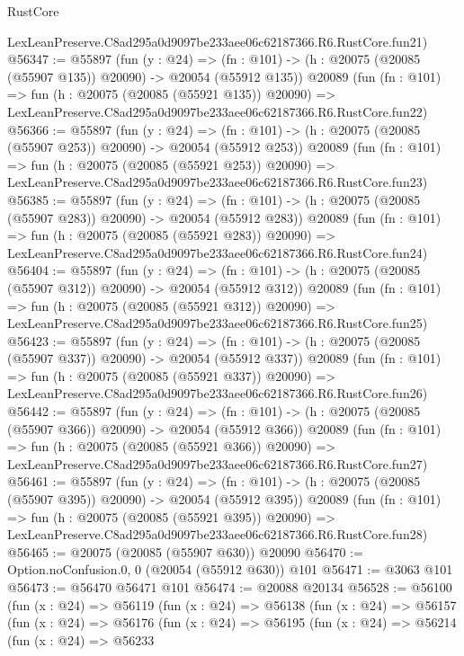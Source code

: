 \begin{lexlean}{RustCore}
\begin{coremodule}
    LexLeanPreserve.C8ad295a0d9097be233aee06c62187366.R6.RustCore.fun21)
@56347 := @55897
    (fun (y : @24) =>
    (fn : @101) -> (h : @20075 (@20085 (@55907 @135)) @20090) -> @20054 (@55912 @135))
    @20089
    (fun (fn : @101) =>
    fun (h : @20075 (@20085 (@55921 @135)) @20090) =>
    LexLeanPreserve.C8ad295a0d9097be233aee06c62187366.R6.RustCore.fun22)
@56366 := @55897
    (fun (y : @24) =>
    (fn : @101) -> (h : @20075 (@20085 (@55907 @253)) @20090) -> @20054 (@55912 @253))
    @20089
    (fun (fn : @101) =>
    fun (h : @20075 (@20085 (@55921 @253)) @20090) =>
    LexLeanPreserve.C8ad295a0d9097be233aee06c62187366.R6.RustCore.fun23)
@56385 := @55897
    (fun (y : @24) =>
    (fn : @101) -> (h : @20075 (@20085 (@55907 @283)) @20090) -> @20054 (@55912 @283))
    @20089
    (fun (fn : @101) =>
    fun (h : @20075 (@20085 (@55921 @283)) @20090) =>
    LexLeanPreserve.C8ad295a0d9097be233aee06c62187366.R6.RustCore.fun24)
@56404 := @55897
    (fun (y : @24) =>
    (fn : @101) -> (h : @20075 (@20085 (@55907 @312)) @20090) -> @20054 (@55912 @312))
    @20089
    (fun (fn : @101) =>
    fun (h : @20075 (@20085 (@55921 @312)) @20090) =>
    LexLeanPreserve.C8ad295a0d9097be233aee06c62187366.R6.RustCore.fun25)
@56423 := @55897
    (fun (y : @24) =>
    (fn : @101) -> (h : @20075 (@20085 (@55907 @337)) @20090) -> @20054 (@55912 @337))
    @20089
    (fun (fn : @101) =>
    fun (h : @20075 (@20085 (@55921 @337)) @20090) =>
    LexLeanPreserve.C8ad295a0d9097be233aee06c62187366.R6.RustCore.fun26)
@56442 := @55897
    (fun (y : @24) =>
    (fn : @101) -> (h : @20075 (@20085 (@55907 @366)) @20090) -> @20054 (@55912 @366))
    @20089
    (fun (fn : @101) =>
    fun (h : @20075 (@20085 (@55921 @366)) @20090) =>
    LexLeanPreserve.C8ad295a0d9097be233aee06c62187366.R6.RustCore.fun27)
@56461 := @55897
    (fun (y : @24) =>
    (fn : @101) -> (h : @20075 (@20085 (@55907 @395)) @20090) -> @20054 (@55912 @395))
    @20089
    (fun (fn : @101) =>
    fun (h : @20075 (@20085 (@55921 @395)) @20090) =>
    LexLeanPreserve.C8ad295a0d9097be233aee06c62187366.R6.RustCore.fun28)
@56465 := @20075 (@20085 (@55907 @630)) @20090
@56470 := Option.noConfusion.{0, 0} (@20054 (@55912 @630)) @101
@56471 := @3063 @101
@56473 := @56470 @56471 @101
@56474 := @20088 @20134
@56528 := @56100
    (fun (x : @24) =>
    @56119
      (fun (x : @24) =>
      @56138
        (fun (x : @24) =>
        @56157
          (fun (x : @24) =>
          @56176
            (fun (x : @24) =>
            @56195
              (fun (x : @24) =>
              @56214
                (fun (x : @24) =>
                @56233

\end{coremodule}
\end{lexlean}
